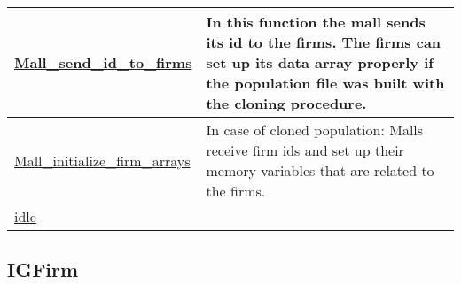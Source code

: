 \documentclass[a4paper,11pt]{article}
\begin{document}
\begin{landscape}
\begin{longtable}[H!]{ll}
\midrule
\url{Mall_send_id_to_firms} \index{\url{Mall_send_id_to_firms}} & \parbox{10cm}{In this function the mall sends its id to the firms. The firms can set up its data array properly if the population file was built with the cloning procedure. } \\
\midrule
\url{Mall_initialize_firm_arrays}  & \parbox{10cm}{In case of cloned population: Malls receive firm ids and set up their memory variables that are related to the firms.} \\
\midrule
\url{idle}  & \parbox{10cm}{} \\
\end{longtable}
\end{landscape}



\clearpage
\subsection{IGFirm}
\end{document}
